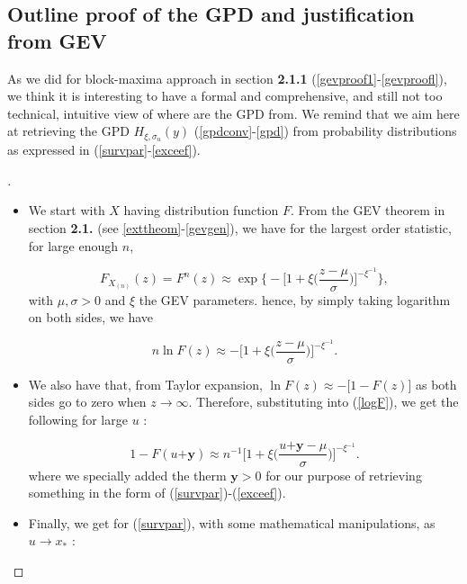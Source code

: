 \subsection{Outline proof of the GPD and justification from GEV} As we did for block-maxima approach in section \textbf{2.1.1} (\ref{gevproof1}-\ref{gevproofl}), we think it is interesting to have a formal and comprehensive, and still not too technical, intuitive view of where are the GPD from. We remind that we aim here at retrieving the GPD $H_{\xi,\sigma_u}(y)$ (\ref{gpdconv}-\ref{gpd}) from probability distributions as expressed in (\ref{survpar}-\ref{exceef}).

\begin{proof}[\nopunct ] 
\ \ \ \begin{itemize}
	 \item We start with $X$ having distribution function $F$. From the GEV theorem in section %
	 \textbf{2.1.} (see \ref{exttheom}-\ref{gevgen}), we have for the largest order statistic, for large enough $n$,  
	
	\begin{equation}
	F_{X_{(n)}}(z)=F^n(z)\approx \exp\Bigg\{ -\bigg[1+\xi\bigg(\frac{z-\mu}{\sigma}\bigg)\bigg]^{-\xi^{-1}}\Bigg\},
	\end{equation} 
	with $\mu,\sigma>0$ and $\xi$ the GEV parameters. hence, by simply taking logarithm on both sides, we have
	
	\begin{equation} \label{logF}
	n \ln F(z)\approx -\Bigg[1+\xi\bigg(\frac{z-\mu}{\sigma}\bigg)\Bigg]^{-\xi^{-1}}.
	\end{equation}
		\item We also have that, from Taylor expansion,
		$\ln F(z)\approx -\big[1-F(z)\big]$
		as both sides go to zero when $z\rightarrow\infty$. Therefore, substituting into (\ref{logF}), we get the following for large $u$ :
		
		\begin{equation*}
		1-F(u\boldsymbol{+y})\approx n^{-1}\bigg[1+\xi\bigg(\frac{u\boldsymbol{+y}-\mu}{\sigma}\bigg)\bigg]^{-\xi^{-1}}.
		\end{equation*}
		where we specially added the therm $\boldsymbol{y}>0$ for our purpose of retrieving something in the form of 
		(\ref{survpar})-(\ref{exceef}). 
		
		\item Finally, we get for (\ref{survpar}), with some mathematical manipulations, as 
		$u\rightarrow x_*$ :
		

\end{itemize}
\end{proof}
